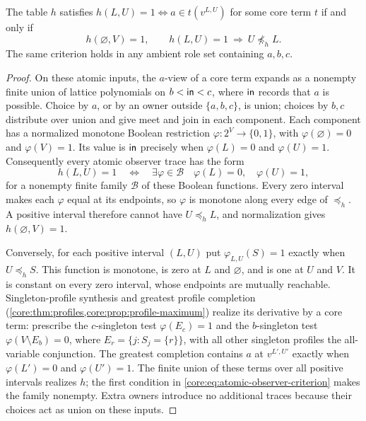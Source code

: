 \begin{theorem}
\label{core:thm:atomic-observer}
The table $h$ satisfies
$h(L,U)=1\iff a\in t(v^{L,U})$ for some core term $t$ if and only if
\begin{equation}\label{core:eq:atomic-observer-criterion}
 h(\varnothing,V)=1,\qquad
 h(L,U)=1\ \Longrightarrow\ U\not\preceq_h L.
\end{equation}
The same criterion holds in any ambient role set containing $a,b,c$.
\end{theorem}
\begin{proof}
On these atomic inputs, the $a$-view of a core term expands as a nonempty
finite union of lattice polynomials on $b<\mathsf{in}<c$, where
$\mathsf{in}$ records that $a$ is possible. Choice by $a$, or by an owner
outside $\{a,b,c\}$, is union; choices by $b,c$ distribute over union
and give meet and join in each component. Each component has a normalized
monotone Boolean restriction $\varphi:2^V\to\{0,1\}$, with
$\varphi(\varnothing)=0$ and $\varphi(V)=1$. Its value is
$\mathsf{in}$ precisely when $\varphi(L)=0$ and $\varphi(U)=1$.
Consequently every atomic observer trace has the form
\begin{equation}\label{core:eq:atomic-observer-expansion}
 h(L,U)=1\quad\Longleftrightarrow\quad
 \exists\varphi\in\mathcal B\quad
 \varphi(L)=0,\quad\varphi(U)=1,
\end{equation}
for a nonempty finite family $\mathcal B$ of these Boolean functions.
Every zero interval makes each $\varphi$ equal at its endpoints, so
$\varphi$ is monotone along every edge of $\preceq_h$. A positive
interval therefore cannot have $U\preceq_h L$, and normalization gives
$h(\varnothing,V)=1$.

Conversely, for each positive interval $(L,U)$ put
$\varphi_{L,U}(S)=1$ exactly when $U\preceq_h S$.
This function is monotone, is zero at $L$ and $\varnothing$, and is one
at $U$ and $V$. It is constant on every zero interval, whose endpoints
are mutually reachable. Singleton-profile synthesis and greatest profile
completion (\cref{core:thm:profiles,core:prop:profile-maximum}) realize its
derivative by a core term: prescribe the $c$-singleton test
$\varphi(E_c)=1$ and the $b$-singleton test
$\varphi(V\setminus E_b)=0$, where $E_r=\{j:S_j=\{r\}\}$, with
all other singleton profiles the all-variable conjunction. The greatest
completion contains $a$ at
$v^{L',U'}$ exactly when
$\varphi(L')=0$ and $\varphi(U')=1$.
The finite union of these terms over all positive intervals realizes $h$;
the first condition in \eqref{core:eq:atomic-observer-criterion} makes the
family nonempty. Extra owners introduce no additional traces because their
choices act as union on these inputs.
\end{proof}

